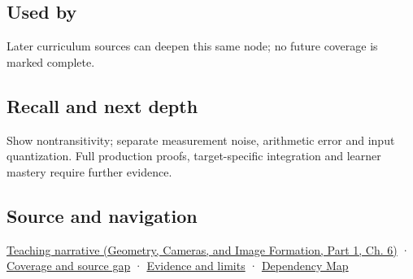 \subsection{Used by}\label{appendix-b5b83329215b-used-by}

\hypertarget{appendix-b5b83329215b-used-by}{}

Later curriculum sources can deepen this same node; no future coverage is marked complete.

\subsection{Recall and next depth}\label{appendix-b5b83329215b-recall-and-next-depth}

\hypertarget{appendix-b5b83329215b-recall-and-next-depth}{}

Show nontransitivity; separate measurement noise, arithmetic error and input quantization. Full production proofs, target-specific integration and learner mastery require further evidence.

\subsection{Source and navigation}\label{appendix-b5b83329215b-source-and-navigation}

\hypertarget{appendix-b5b83329215b-source-and-navigation}{}

\href{../03-Geometry-Cameras-and-Image-Formation-P01/main.pdf\#02-foundations-ii-ch037-reliability-begins-at-the-boundary-of-the-calculation}{Teaching narrative (Geometry, Cameras, and Image Formation, Part 1, Ch. 6)} · \hyperref[appendix-fd090d982a15-phase-6---parts-501-600]{Coverage and source gap} · \hyperref[appendix-a103e7846d21-phase-6---source-analysis-and-verification]{Evidence and limits} · \hyperref[appendix-4ad47bdd269a]{Dependency Map}
